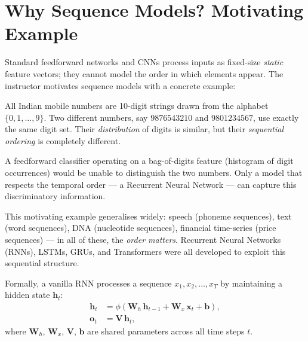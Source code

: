 \documentclass[12pt,a4paper]{article}
\begin{document}
\section{Why Sequence Models? Motivating Example}
\label{sec:seqmodels}

Standard feedforward networks and CNNs process inputs as fixed-size
\emph{static} feature vectors; they cannot model the order in which elements
appear.  The instructor motivates sequence models with a concrete example:

\begin{example}[title=Mobile Phone Number Recognition]
All Indian mobile numbers are 10-digit strings drawn from the alphabet
$\{0,1,\ldots,9\}$.  Two different numbers, say $9876543210$ and $9801234567$,
use exactly the same digit set.  Their \emph{distribution} of digits
is similar, but their \emph{sequential ordering} is completely different.

A feedforward classifier operating on a bag-of-digits feature (histogram of
digit occurrences) would be unable to distinguish the two numbers.  Only a
model that respects the temporal order — a Recurrent Neural Network —
can capture this discriminatory information.
\end{example}

\begin{keyinsight}
This motivating example generalises widely: speech (phoneme sequences),
text (word sequences), DNA (nucleotide sequences), financial time-series
(price sequences) — in all of these, the \emph{order matters}.
Recurrent Neural Networks (RNNs), LSTMs, GRUs, and Transformers were all
developed to exploit this sequential structure.
\end{keyinsight}

Formally, a vanilla RNN processes a sequence $x_1, x_2, \ldots, x_T$ by
maintaining a hidden state $\mathbf{h}_t$:
\begin{align}
  \label{eq:rnn}
  \mathbf{h}_t &= \phi\!\left(\mathbf{W}_h\, \mathbf{h}_{t-1}
                              + \mathbf{W}_x\, \mathbf{x}_t
                              + \mathbf{b}\right), \\
  \mathbf{o}_t &= \mathbf{V}\, \mathbf{h}_t,
\end{align}
where $\mathbf{W}_h$, $\mathbf{W}_x$, $\mathbf{V}$, $\mathbf{b}$ are shared
parameters across all time steps $t$.

\end{document}
